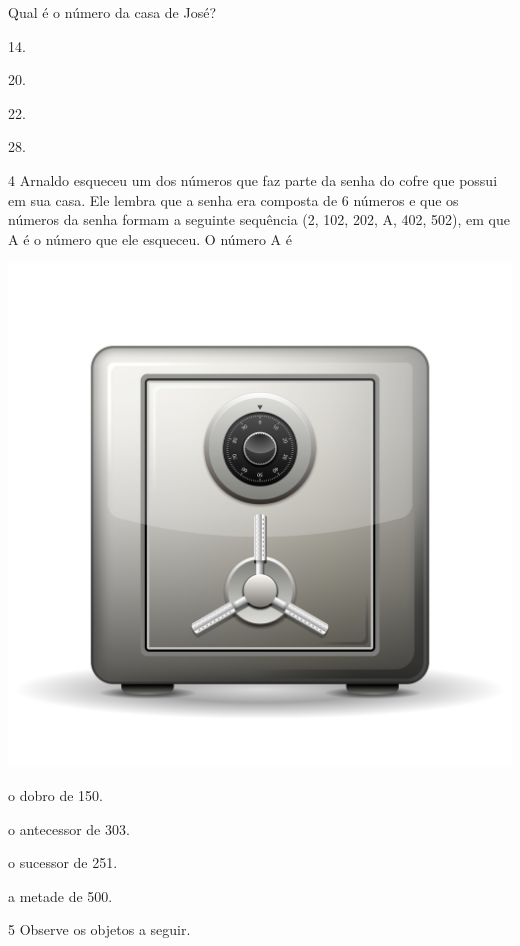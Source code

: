 
\pagebreak
Qual é o número da casa de José?

\begin{escolha}
\item
  14.
\item
  20.
\item
  22.
\item
  28.
\end{escolha}

\num{4} Arnaldo esqueceu um dos números que faz parte da senha do cofre que
possui em sua casa. Ele lembra que a senha era composta de 6 números e
que os números da senha formam a seguinte sequência (2, 102, 202,
A, 402, 502), em que A é o número que ele esqueceu. O número A é


\begin{center}
\includegraphics[width=.7\textwidth]{media/image86c.jpeg}
\end{center}

\begin{escolha}
\item
  o dobro de 150.
\item
  o antecessor de 303.
\item
  o sucessor de 251.
\item
  a metade de 500.
\end{escolha}

\pagebreak
\num{5} Observe os objetos a seguir.

